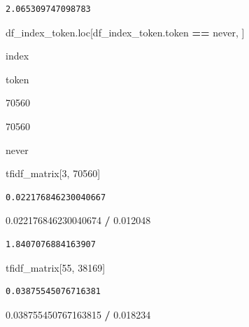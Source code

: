 \documentclass[
  11pt,
  a4paper,
]{article}
\newenvironment{Shaded}{\begin{snugshade}}{\end{snugshade}}
\newcommand{\DecValTok}[1]{\textcolor[rgb]{0.00,0.00,0.81}{#1}}
\newcommand{\FloatTok}[1]{\textcolor[rgb]{0.00,0.00,0.81}{#1}}
\newcommand{\NormalTok}[1]{#1}
\newcommand{\OperatorTok}[1]{\textcolor[rgb]{0.81,0.36,0.00}{\textbf{#1}}}
\newcommand{\StringTok}[1]{\textcolor[rgb]{0.31,0.60,0.02}{#1}}
\begin{document}
\begin{verbatim}
2.065309747098783
\end{verbatim}

\begin{Shaded}
\begin{Highlighting}[]
\NormalTok{df\_index\_token.loc[df\_index\_token.token }\OperatorTok{==} \StringTok{\textquotesingle{}never\textquotesingle{}}\NormalTok{, ]}
\end{Highlighting}
\end{Shaded}

index

token

70560

70560

never

\begin{Shaded}
\begin{Highlighting}[]
\NormalTok{tfidf\_matrix[}\DecValTok{3}\NormalTok{, }\DecValTok{70560}\NormalTok{]}
\end{Highlighting}
\end{Shaded}

\begin{verbatim}
0.022176846230040667
\end{verbatim}

\begin{Shaded}
\begin{Highlighting}[]
\FloatTok{0.022176846230040674} \OperatorTok{/} \FloatTok{0.012048}
\end{Highlighting}
\end{Shaded}

\begin{verbatim}
1.8407076884163907
\end{verbatim}

\begin{Shaded}
\begin{Highlighting}[]
\NormalTok{tfidf\_matrix[}\DecValTok{55}\NormalTok{, }\DecValTok{38169}\NormalTok{]}
\end{Highlighting}
\end{Shaded}

\begin{verbatim}
0.03875545076716381
\end{verbatim}

\begin{Shaded}
\begin{Highlighting}[]
\FloatTok{0.038755450767163815} \OperatorTok{/} \FloatTok{0.018234}
\end{Highlighting}
\end{Shaded}
\end{document}
